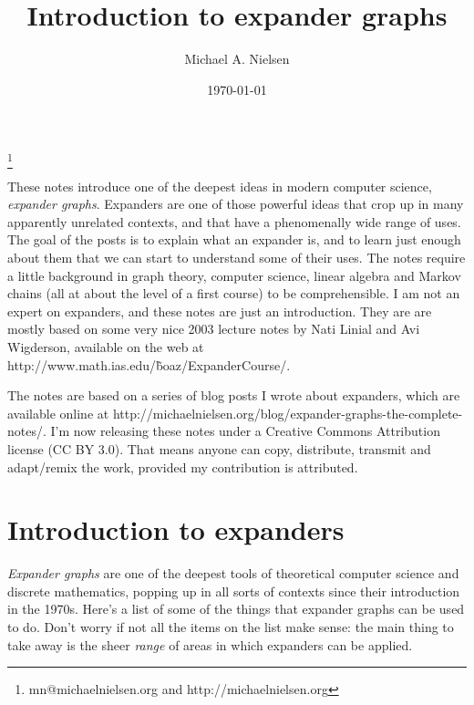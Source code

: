 \documentclass[12pt]{article}
\begin{document}
\title{Introduction to expander graphs} 

\author{Michael A. Nielsen} \thanks{mn@michaelnielsen.org and
  http://michaelnielsen.org}

\date{\today}

\maketitle

These notes introduce one of the deepest ideas in modern computer
science, \emph{expander graphs}.  Expanders are one of those powerful
ideas that crop up in many apparently unrelated contexts, and that
have a phenomenally wide range of uses.  The goal of the posts is to
explain what an expander is, and to learn just enough about them that
we can start to understand some of their uses.  The notes require a
little background in graph theory, computer science, linear algebra
and Markov chains (all at about the level of a first course) to be
comprehensible.  I am not an expert on expanders, and these notes are
just an introduction.  They are are mostly based on some very nice
2003 lecture notes by Nati Linial and Avi Wigderson, available on the
web at http://www.math.ias.edu/\~boaz/ExpanderCourse/.

The notes are based on a series of blog posts I wrote about expanders,
which are available online at
http://michaelnielsen.org/blog/expander-graphs-the-complete-notes/.
I'm now releasing these notes under a Creative Commons Attribution
license (CC BY 3.0).  That means anyone can copy, distribute, transmit
and adapt/remix the work, provided my contribution is attributed.

\section{Introduction to expanders}

\emph{Expander graphs} are one of the deepest tools of theoretical
computer science and discrete mathematics, popping up in all sorts of
contexts since their introduction in the 1970s.  Here's a list of some
of the things that expander graphs can be used to do.  Don't worry if
not all the items on the list make sense: the main thing to take away
is the sheer \emph{range} of areas in which expanders can be applied.
\end{document}
